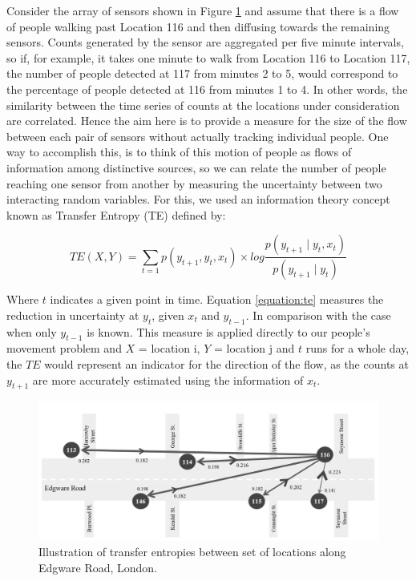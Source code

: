 
Consider the array of sensors shown in Figure \ref{figure:applications:transent} and assume that there is a flow of people walking past Location 116 and then diffusing towards the remaining sensors. Counts generated by the sensor are aggregated per five minute intervals, so if, for example, it takes one minute to walk from Location 116 to Location 117, the number of people detected at 117 from minutes 2 to 5, would correspond to the percentage of people detected at 116 from minutes 1 to 4. In other words, the similarity between the time series of counts at the locations under consideration are correlated. Hence the aim here is to provide a measure for the size of the flow between each pair of sensors without actually tracking individual people. One way to accomplish this, is to think of this motion of people as flows of information among distinctive sources, so we can relate the number of people reaching one sensor from another by measuring the uncertainty between two interacting random variables. For this, we used an information theory concept known as Transfer
Entropy (TE) defined by:

\begin{equation} \label{equation:te}
  TE(X,Y) = \sum_{t=1} p(y_{t+1}, y_{t}, x_{t}) \times { log{ \frac{p(y_{t+1} \mid y_{t}, x_{t})}{p(y_{t+1} \mid y_{t})}} }
\end{equation}

Where $t$ indicates a given point in time.
Equation \ref{equation:te} measures the reduction in uncertainty at $y_{t}$, given $x_{t}$ and $y_{t-1}$.
In comparison with the case when only $y_{t-1}$ is known.
This measure is applied directly to our people's movement problem and $X$ = location i, $Y$ = location j and $t$ runs for a whole day, the $TE$ would represent an indicator for the direction of the flow, as the counts at $y_{t+1}$ are more accurately estimated using the information of $x_{t}$.

\begin{figure}
  \includegraphics[trim={0 0 0 0},clip]{images/applications-transfer-entropy.png}
  \caption{Illustration of transfer entropies between set of locations along Edgware Road, London.}
  \label{figure:applications:transent}
\end{figure}

